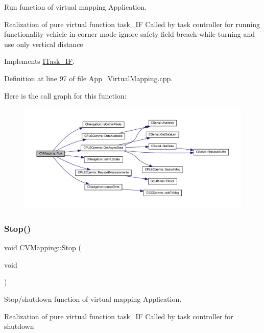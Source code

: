 Run function of virtual mapping Application. 

Realization of pure virtual function task\+\_\+\+IF Called by task controller for running functionality vehicle in corner mode ignore safety field breach while turning and use only vertical distance 

Implements \mbox{\hyperlink{class_i_task___i_f_ab73cc5879a61d00fc59b72cce32cc6f7}{I\+Task\+\_\+\+IF}}.



Definition at line 97 of file App\+\_\+\+Virtual\+Mapping.\+cpp.

Here is the call graph for this function\+:\nopagebreak
\begin{figure}[H]
\begin{center}
\leavevmode
\includegraphics[width=350pt]{class_c_v_mapping_a8f064fcfd01953d7072efd5de23f89ef_cgraph}
\end{center}
\end{figure}
\mbox{\label{class_c_v_mapping_ad4e34f79b444109d0cbf1223881126dc}} 
\subsubsection{\texorpdfstring{Stop()}{Stop()}}
{\footnotesize\ttfamily void C\+V\+Mapping\+::\+Stop (\begin{DoxyParamCaption}\item[{void}]{ }\end{DoxyParamCaption})\hspace{0.3cm}{\ttfamily [virtual]}}



Stop/shutdown function of virtual mapping Application. 

Realization of pure virtual function task\+\_\+\+IF Called by task controller for shutdown 

